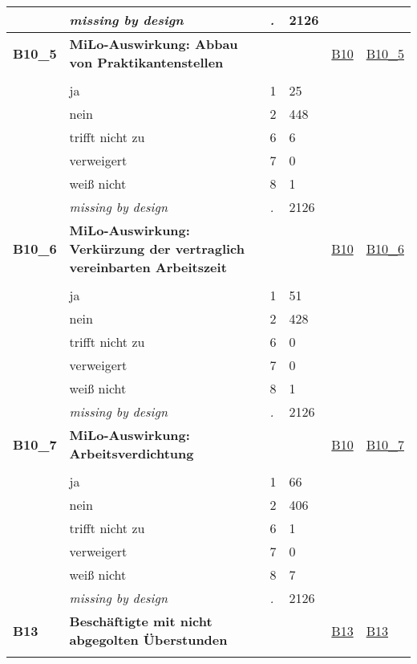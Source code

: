\begin{longtable}{| L{2.45cm} | L{6cm} | C{1.5cm} | R{1cm} | C{2.25cm} | C{2.25cm} |}
   & \textit{missing by design} & \textit{.} & 2126 &  &  \\ 
   \midrule
\textbf{B10\_5}\label{var:B10:5} & \textbf{MiLo-Auswirkung: Abbau von Praktikantenstellen} &  &  & \hyperref[B10]{B10} & \hyperref[var:suf:B10:5]{B10\_5} \\ 
   &  &  &  &  &  \\ 
   & ja & 1 & 25 &  &  \\ 
   & nein & 2 & 448 &  &  \\ 
   & trifft nicht zu & 6 & 6 &  &  \\ 
   & verweigert & 7 & 0 &  &  \\ 
   & weiß nicht & 8 & 1 &  &  \\ 
   & \textit{missing by design} & \textit{.} & 2126 &  &  \\ 
   \midrule
\textbf{B10\_6}\label{var:B10:6} & \textbf{MiLo-Auswirkung: Verkürzung der vertraglich vereinbarten Arbeitszeit} &  &  & \hyperref[B10]{B10} & \hyperref[var:suf:B10:6]{B10\_6} \\ 
   &  &  &  &  &  \\ 
   & ja & 1 & 51 &  &  \\ 
   & nein & 2 & 428 &  &  \\ 
   & trifft nicht zu & 6 & 0 &  &  \\ 
   & verweigert & 7 & 0 &  &  \\ 
   & weiß nicht & 8 & 1 &  &  \\ 
   & \textit{missing by design} & \textit{.} & 2126 &  &  \\ 
   \midrule
\textbf{B10\_7}\label{var:B10:7} & \textbf{MiLo-Auswirkung: Arbeitsverdichtung} &  &  & \hyperref[B10]{B10} & \hyperref[var:suf:B10:7]{B10\_7} \\ 
   &  &  &  &  &  \\ 
   & ja & 1 & 66 &  &  \\ 
   & nein & 2 & 406 &  &  \\ 
   & trifft nicht zu & 6 & 1 &  &  \\ 
   & verweigert & 7 & 0 &  &  \\ 
   & weiß nicht & 8 & 7 &  &  \\ 
   & \textit{missing by design} & \textit{.} & 2126 &  &  \\ 
   \midrule
\textbf{B13}\label{var:B13} & \textbf{Beschäftigte mit nicht abgegolten Überstunden} &  &  & \hyperref[B13]{B13} & \hyperref[var:suf:B13]{B13} \\ 
   &  &  &  &  &  \\ 

\end{longtable}
